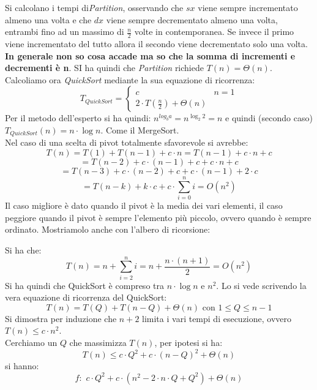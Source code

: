 \documentclass[a4paper,12pt,oneside,tikz]{book}
\begin{document}
Si calcolano i tempi di\textit{Partition}, osservando che $sx$ viene sempre incrementato almeno una volta e che $dx$ viene sempre decrementato almeno una volta, entrambi fino ad un massimo di $\frac{n}{2}$ volte in contemporanea. Se invece il primo viene incrementato del tutto allora il secondo viene decrementato solo una volta. \textbf{In generale non so cosa accade ma so che la somma di incrementi e decrementi è n}. SI ha quindi che \textit{Partition} richiede $T(n)=\Theta(n)$.\\
Calcoliamo ora \textit{QuickSort} mediante la sua equazione di ricorrenza:
$$T_{QuickSort}=\begin{cases}
c & n=1\\
2\cdot T\left(\frac{n}{2}\right)+\Theta(n)
\end{cases}$$
Per il metodo dell'esperto si ha quindi: $n^{log_b a}=n^{\log_2  2}=n$ e quindi (secondo caso) $T_{QuickSort}(n)=n\cdot\log n$. Come il MergeSort.\\
Nel caso di una scelta di pivot totalmente sfavorevole si avrebbe:
$$T(n)=T(1)+T(n-1)+c\cdot n=T(n-1)+c\cdot n+c$$
$$=T(n-2)+c\cdot (n-1)+c+c\cdot n+c$$
$$=T(n-3)+c\cdot(n-2)+c+c\cdot(n-1)+2\cdot c$$
$$=T(n-k)+k\cdot c+c\cdot \sum_{i=0}^n i=O(n^2)$$
Il caso migliore è dato quando il pivot è la media dei vari elementi, il caso peggiore quando il pivot è sempre l'elemento più piccolo, ovvero quando è sempre ordinato.
\newpage
Mostriamolo anche con l'albero di ricorsione:
\begin{center}
\end{center}
Si ha che:
$$T(n)=n+\sum_{i=2}^ni=n+\frac{n\cdot(n+1)}{2}=O(n^2)$$
Si ha quindi che QuickSort è compreso tra $n\cdot\log n$ e $n^2$. Lo si vede scrivendo la vera equazione di ricorrenza del QuickSort:
$$T(n)=T(Q)+T(n-Q)+\Theta(n) \mbox{ con } 1\leq Q	\leq n-1$$
Si dimostra per induzione che $n+2$ limita i vari tempi di esecuzione, ovvero $T(n)\leq c\cdot n^2$.\\Cerchiamo un $Q$ che massimizza $T(n)$, per ipotesi si ha:
$$T(n)\leq c\cdot Q^2+c\cdot(n-Q)^2+\Theta(n)$$
si hanno:
$$f:\,\, c\cdot Q^2+c\cdot(n^2-2\cdot n\cdot Q+Q^2)+\Theta(n)$$
\end{document}

